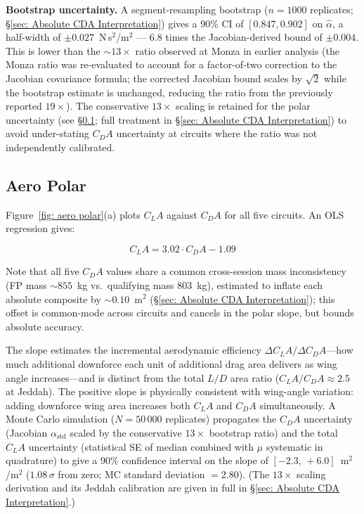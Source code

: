 \textbf{Bootstrap uncertainty.} A segment-resampling bootstrap ($n = 1000$ replicates; \S\ref{sec: Absolute CDA Interpretation}) gives a 90\% CI of $[0.847, 0.902]$ on $\hat\alpha$, a half-width of $\pm 0.027$~N\,s$^2$/m$^2$ --- 6.8 times the Jacobian-derived bound of $\pm 0.004$. This is lower than the $\sim\!13\times$ ratio observed at Monza in earlier analysis (the Monza ratio was re-evaluated to account for a factor-of-two correction to the Jacobian covariance formula; the corrected Jacobian bound scales by $\sqrt{2}$ while the bootstrap estimate is unchanged, reducing the ratio from the previously reported $19\times$). The conservative $13\times$ scaling is retained for the polar uncertainty (see \S\ref{sec: Aero Polar}; full treatment in \S\ref{sec: Absolute CDA Interpretation}) to avoid under-stating $C_DA$ uncertainty at circuits where the ratio was not independently calibrated.

\subsection{Aero Polar}
\label{sec: Aero Polar}

Figure~\ref{fig: aero polar}(a) plots $C_LA$ against $C_DA$ for all five circuits. An OLS regression gives:

\begin{equation}
    C_LA = 3.02 \cdot C_DA - 1.09
    \label{eq: ols polar}
\end{equation}

Note that all five $C_DA$ values share a common cross-session mass inconsistency (FP mass $\sim\!855$~kg vs.\ qualifying mass $803$~kg), estimated to inflate each absolute composite by $\sim\!0.10$~m$^2$ (\S\ref{sec: Absolute CDA Interpretation}); this offset is common-mode across circuits and cancels in the polar slope, but bounds absolute accuracy.

The slope estimates the incremental aerodynamic efficiency $\Delta C_LA/\Delta C_DA$---how much additional downforce each unit of additional drag area delivers as wing angle increases---and is distinct from the total $L/D$ area ratio ($C_LA/C_DA \approx 2.5$ at Jeddah). The positive slope is physically consistent with wing-angle variation: adding downforce wing area increases both $C_LA$ and $C_DA$ simultaneously. A Monte Carlo simulation ($N = 50\,000$ replicates) propagates the $C_DA$ uncertainty (Jacobian $\alpha_\text{std}$ scaled by the conservative $13\times$ bootstrap ratio) and the total $C_LA$ uncertainty (statistical SE of median combined with $\mu$ systematic in quadrature) to give a 90\% confidence interval on the slope of $[-2.3,\, +6.0]$~m$^2$/m$^2$ ($1.08\,\sigma$ from zero; MC standard deviation $= 2.80$). (The $13\times$ scaling derivation and its Jeddah calibration are given in full in \S\ref{sec: Absolute CDA Interpretation}.)

